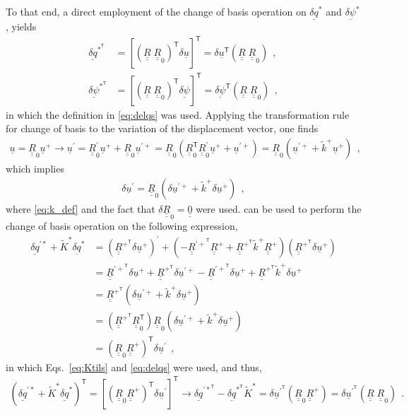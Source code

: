 \documentclass[12pt,a4paper,oneside,english]{abntex2} %
\newcommand{\vect}[1]{\underline{#1}}
\def\tens#1{\underline{\underline{#1}}}
\def\til#1{\widetilde{#1}}
\def\lb{\left[}
\def\rb{\right]}
\def\lp{\left(}
\def\rp{\right)}
\def\T{\mathsf{T}}
\def\R{\tens{R}}
\def\Rp{\R^+}
\def\RpT{\R^{+^\T}}
\def\RpprimeT{\R^{{\prime +}^\T}}
\def\Rz{\R_0}
\def\Rzp{\R^{\prime}_0}
\def\RzT{\R^\T_0}
\def\u{\vect{u}}
\def\uT{\u^\T}
\def\uplus{\u^{+}}
\def\uprime{\u^{\prime}}
\def\uprimeT{\u^{\prime^\T}}
\def\upprime{\u^{\prime+}}
\def\ktil{\til{k}}
\def\ktilp{\ktil^{+}}
\def\Ktil{\til{K}}
\def\Ktils{\Ktil^{*}}
\def\delq{\vect{\delta q}}
\def\delqs{\delq^*}
\def\delqsT{\delq^{*^\T}}
\def\delqps{\delq^{\prime*}}
\def\delqpsT{\delq^{{\prime*}^\T}}
\def\delpsi{\vect{\delta\psi}}
\def\delpsiT{\delpsi^\T}
\def\delpsis{\delpsi^*}
\def\delpsisT{\delpsi^{*^\T}}
\def\RRz{\lp\R\;\Rz\rp}
\def\RRzT{\RRz^\T}
\begin{document}
\begin{apendicesenv}
To that end, a direct employment of the change of basis operation on $\delqs$ and $\delpsis$, yields
\begin{align}
    \delqsT &= \lb\RRzT\delta\u\rb^\T = \delta\uT\RRz \ \ ,
    \label{eq:delqsT_appendix} 
    \\
    \delpsisT &= \lb\RRzT\delpsi\rb^\T = \delpsiT\RRz \ \ ,
    \label{eq:delpsisT_appendix}
\end{align}
in which the definition in \cref{eq:delqs} was used. Applying the transformation rule for change of basis to the variation of the displacement vector, one finds
\begin{align}
    \u = \Rz\uplus \rightarrow \uprime = \Rzp\uplus + \Rz\upprime = \Rz\lp\RzT\Rzp\uplus+\upprime\rp = \Rz\lp\upprime+\ktilp\uplus\rp \ \ ,
    \label{eq:uprime_appendix}
\end{align}
which implies
\begin{align}
    \delta\uprime = \Rz\lp\delta\upprime+\ktilp\delta\uplus\rp \ \ ,
    \label{eq:delta_uprime_appendix}
\end{align}
where \cref{eq:k_def} and the fact that $\delta\Rz = \tens{0}$ were used.  can be used to perform the change of basis operation on the following expression,
\begin{align}
    \delqps + \Ktils\delqs &= \lp\RpT\delta\uplus\rp^\prime + \lp-\RpprimeT\Rp+\RpT\ktilp\Rp\rp \lp\RpT\delta\uplus\rp
    \nonumber 
    \\
    &=\RpprimeT\delta\uplus + \RpT\delta\upprime - \RpprimeT\delta\uplus + \RpT\ktilp\delta\uplus
    \nonumber 
    \\
    &=\RpT\lp\delta\upprime+\ktilp\delta\uplus\rp
    \nonumber 
    \\
    &=\lp\RpT\RzT\rp\Rz\lp\delta\upprime+\ktilp\delta\uplus\rp
    \nonumber \\
    &=\lp\Rz\Rp\rp^\T\delta\uprime \ \ ,
    \label{eq:delqps_plus_Ktilsdelqs}
\end{align}
in which Eqs.~\eqref{eq:Ktils} and \eqref{eq:delqs} were used, and thus, 
\begin{align}
    \lp\delqps+\Ktils\delqs\rp^\T = \lb \lp\Rz\Rp\rp^\T\delta\uprime \rb^\T
    \rightarrow
    \delqpsT -\delqsT\Ktils = \delta\uprimeT\lp\Rz\Rp\rp = \delta\uprimeT\RRz \ \ .
    \label{eq:delqps_plus_Ktilsdelqs_T}
\end{align}


\end{apendicesenv}
\end{document}
